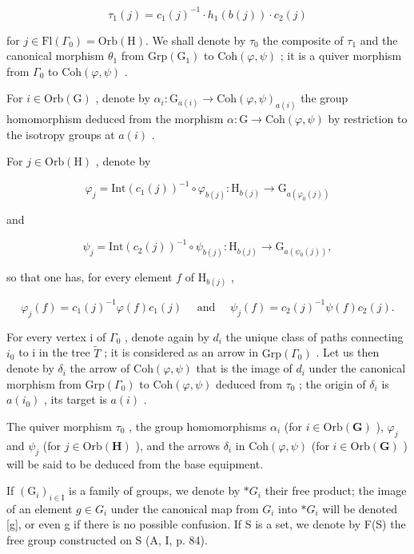 \[
\tau_ {1} (j) = c _ {1} (j) ^ {- 1} \cdot h _ {1} (b (j)) \cdot c _ {2} (j)
\]

for \(j \in \mathrm{Fl}(\Gamma_{0}) = \mathrm{Orb}(\mathrm{H})\). We shall denote by \(\tau_{0}\) the composite of \(\tau_{1}\) and the canonical morphism \(\theta_{1}\) from \(\mathrm{Grp}(\mathrm{G}_{1})\) to \(\mathrm{Coh}(\varphi, \psi)\) ; it is a quiver morphism from \(\Gamma_{0}\) to \(\mathrm{Coh}(\varphi, \psi)\) .

For \(i \in \mathrm{Orb}(\mathrm{G})\) , denote by \(\alpha_i \colon \mathrm{G}_{a(i)} \to \mathrm{Coh}(\varphi, \psi)_{a(i)}\) the group homomorphism deduced from the morphism \(\alpha \colon \mathrm{G} \to \mathrm{Coh}(\varphi, \psi)\) by restriction to the isotropy groups at \(a(i)\) .

For \(j\in \mathrm{Orb(H)}\) , denote by

\[
\varphi_ {j} = \mathrm{Int} (c _ {1} (j)) ^ {- 1} \circ \varphi_ {b (j)} \colon \mathrm{H} _ {b (j)} \to \mathrm{G} _ {a (\varphi_ {0} (j))}
\]

and

\[
\psi_ {j} = \mathrm{Int} (c _ {2} (j)) ^ {- 1} \circ \psi_ {b (j)} \colon \mathrm{H} _ {b (j)} \to \mathrm{G} _ {a (\psi_ {0} (j))},
\]

so that one has, for every element \(f\) of \(\mathrm{H}_{b(j)}\) ,

\[
\varphi_ {j} (f) = c _ {1} (j) ^ {- 1} \varphi (f) c _ {1} (j) \quad \text { and } \quad \psi_ {j} (f) = c _ {2} (j) ^ {- 1} \psi (f) c _ {2} (j).\tag{6}
\]

For every vertex i of \(\Gamma_{0}\) , denote again by \(d_{i}\) the unique class of paths connecting \(i_{0}\) to i in the tree \(\widetilde{T}\) ; it is considered as an arrow in \(\mathrm{Grp}(\Gamma_{0})\) . Let us then denote by \(\delta_{i}\) the arrow of \(\mathrm{Coh}(\varphi,\psi)\) that is the image of \(d_{i}\) under the canonical morphism from \(\mathrm{Grp}(\Gamma_{0})\) to \(\mathrm{Coh}(\varphi,\psi)\) deduced from \(\tau_{0}\) ; the origin of \(\delta_{i}\) is \(a(i_{0})\) , its target is \(a(i)\) .

The quiver morphism \(\tau_0\) , the group homomorphisms \(\alpha_i\) (for \(i \in \mathrm{Orb}(\mathbf{G})\) ), \(\varphi_j\) and \(\psi_j\) (for \(j \in \mathrm{Orb}(\mathbf{H})\) ), and the arrows \(\delta_i\) in \(\mathrm{Coh}(\varphi, \psi)\) (for \(i \in \mathrm{Orb}(\mathbf{G})\) ) will be said to be deduced from the base equipment.

If \((\mathrm{G}_{i})_{i\in\mathrm{I}}\) is a family of groups, we denote by \(*G_{i}\) their free product; the image of an element \(g\in G_{i}\) under the canonical map from \(G_{i}\) into \(*G_{i}\) will be denoted {[}g{]}, or even g if there is no possible confusion. If S is a set, we denote by F(S) the free group constructed on S (A, I, p. 84).

